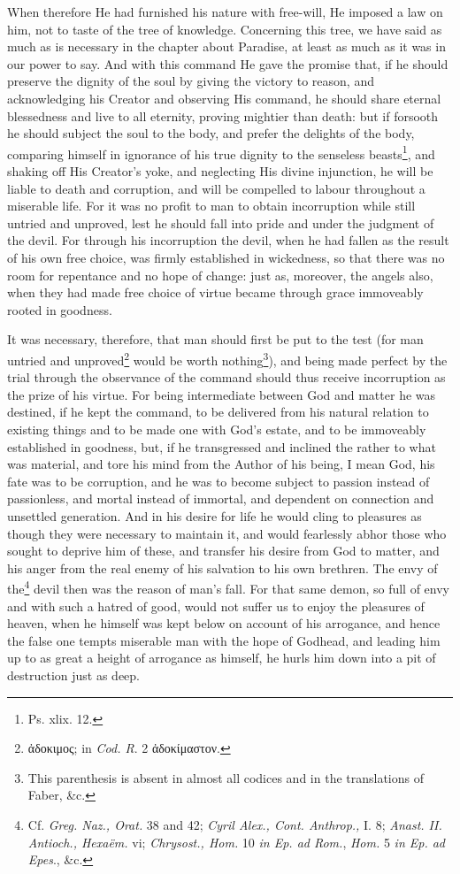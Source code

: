 When therefore He had furnished his nature with free-will, He imposed a law on him, not to taste of the tree of knowledge. Concerning this tree, we have said as much as is necessary in the chapter about Paradise, at least as much as it was in our power to say. And with this command He gave the promise that, if he should preserve the dignity of the soul by giving the victory to reason, and acknowledging his Creator and observing His command, he should share eternal blessedness and live to all eternity, proving mightier than death: but if forsooth he should subject the soul to the body, and prefer the delights of the body, comparing himself in ignorance of his true dignity to the senseless beasts\footnote{Ps. xlix. 12.}, and shaking off His Creator’s yoke, and neglecting His divine injunction, he will be liable to death and corruption, and will be compelled to labour throughout a miserable life. For it was no profit to man to obtain incorruption while still untried and unproved, lest he should fall into pride and under the judgment of the devil. For through his incorruption the devil, when he had fallen as the result of his own free choice, was firmly established in wickedness, so that there was no room for repentance and no hope of change: just as, moreover, the angels also, when they had made free choice of virtue became through grace immoveably rooted in goodness.

It was necessary, therefore, that man should first be put to the test (for man untried and unproved\footnote{\textgreek{ἀδοκιμος}; in \emph{Cod. R}. 2 \textgreek{ἀδοκίμαστον}.} would be worth nothing\footnote{This parenthesis is absent in almost all codices and in the translations of Faber, \&c.}), and being made perfect by the trial through the observance of the command should thus receive incorruption as the prize of his virtue. For being intermediate between God and matter he was destined, if he kept the command, to be delivered from his natural relation to existing things and to be made one with God’s estate, and to be immoveably established in goodness, but, if he transgressed and inclined the rather to what was material, and tore his mind from the Author of his being, I mean God, his fate was to be corruption, and he was to become subject to passion instead of passionless, and mortal instead of immortal, and dependent on connection and unsettled generation. And in his desire for life he would cling to pleasures as though they were necessary to maintain it, and would fearlessly abhor those who sought to deprive him of these, and transfer his desire from God to matter, and his anger from the real enemy of his salvation to his own brethren. The envy of the\footnote{Cf. \emph{Greg. Naz., Orat. }38 and 42; \emph{Cyril Alex., Cont. Anthrop., }I. 8; \emph{Anast. II. Antioch., Hexaëm. }vi; \emph{Chrysost., Hom. }10 \emph{in Ep. ad Rom.}, \emph{Hom. }5 \emph{in Ep. ad Epes}., \&c.} devil then was the reason of man’s fall. For that same demon, so full of envy and with such a hatred of good, would not suffer us to enjoy the pleasures of heaven, when he himself was kept below on account of his arrogance, and hence the false one tempts miserable man with the hope of Godhead, and leading him up to as great a height of arrogance as himself, he hurls him down into a pit of destruction just as deep.

